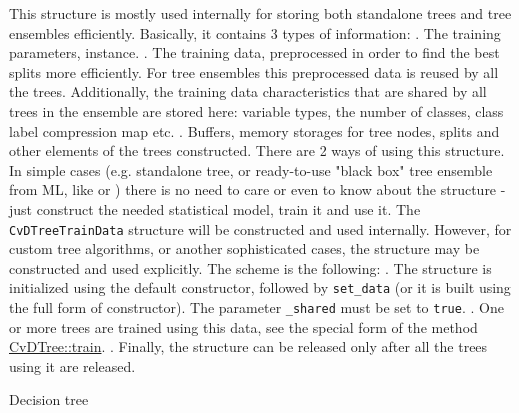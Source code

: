 This structure is mostly used internally for storing both standalone trees and tree ensembles efficiently. Basically, it contains 3 types of information:
\newline
{}. The training parameters,  instance.
. The training data, preprocessed in order to find the best splits more efficiently. For tree ensembles this preprocessed data is reused by all the trees. Additionally, the training data characteristics that are shared by all trees in the ensemble are stored here: variable types, the number of classes, class label compression map etc.
. Buffers, memory storages for tree nodes, splits and other elements of the trees constructed.
\newline
\newline
There are 2 ways of using this structure. In simple cases (e.g. standalone tree, or ready-to-use "black box" tree ensemble from ML, like  or ) there is no need to care or even to know about the structure - just construct the needed statistical model, train it and use it. The \texttt{CvDTreeTrainData} structure will be constructed and used internally. However, for custom tree algorithms, or another sophisticated cases, the structure may be constructed and used explicitly. The scheme is the following:
\newline
{}. The structure is initialized using the default constructor, followed by \texttt{set\_data} (or it is built using the full form of constructor). The parameter \texttt{\_shared} must be set to \texttt{true}.
. One or more trees are trained using this data, see the special form of the method \href{#CvDTree.3A.3Atrain}{CvDTree::train}.
. Finally, the structure can be released only after all the trees using it are released.



Decision tree

